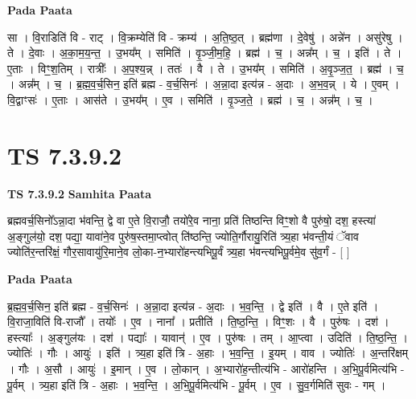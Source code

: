 \documentclass[17pt]{extarticle}
\begin{document}
\textbf{Pada Paata} \newline

सा । वि॒राडिति॑ वि - राट् । वि॒क्रम्येति॑ वि - क्रम्य॑ । अ॒ति॒ष्ठ॒त् । ब्रह्म॑णा । दे॒वेषु॑ । अन्ने॑न । असु॑रेषु । ते । दे॒वाः । अ॒का॒म॒य॒न्त॒ । उ॒भय᳚म् । समिति॑ । वृ॒ञ्जी॒म॒हि॒ । ब्रह्म॑ । च॒ । अन्न᳚म् । च॒ । इति॑ । ते । ए॒ताः । विꣳ॒॒श॒तिम् । रात्रीः᳚ । अ॒प॒श्य॒न्न् । ततः॑ । वै । ते । उ॒भय᳚म् । समिति॑ । अ॒वृ॒ञ्ज॒त॒ । ब्रह्म॑ । च॒ । अन्न᳚म् । च॒ । ब्र॒ह्म॒व॒र्च॒सिन॒ इति॑ ब्रह्म - व॒र्च॒सिनः॑ । अ॒न्ना॒दा इत्य॑न्न - अ॒दाः । अ॒भ॒व॒न्न् । ये । ए॒वम् । वि॒द्वाꣳसः॑ । ए॒ताः । आस॑ते । उ॒भय᳚म् । ए॒व । समिति॑ । वृ॒ञ्ज॒ते॒ । ब्रह्म॑ । च॒ । अन्न᳚म् । च॒ ।  \newline




\section*{ TS 7.3.9.2 }

\textbf{TS 7.3.9.2 } \newline
\textbf{Samhita Paata} \newline

ब्रह्मवर्च॒सिनो᳚ऽन्ना॒दा भ॑वन्ति॒ द्वे वा ए॒ते वि॒राजौ॒ तयो॑रे॒व नाना॒ प्रति॑ तिष्ठन्ति विꣳ॒॒शो वै पुरु॑षो॒ दश॒ हस्त्या॑ अ॒ङ्गुल॑यो॒ दश॒ पद्या॒ यावा॑ने॒व पुरु॑ष॒स्तमा॒प्त्वोत् ति॑ष्ठन्ति॒ ज्योति॒र्गौरायु॒रिति॑ त्र्य॒हा भ॑वन्ती॒यं ॅवाव ज्योति॑र॒न्तरि॑क्षं॒ गौर॒सावायु॑रि॒माने॒व लो॒का-न॒भ्यारो॑हन्त्यभिपू॒र्वं त्र्य॒हा भ॑वन्त्यभिपू॒र्वमे॒व सु॑व॒र्गं - [  ] \newline

\textbf{Pada Paata} \newline

ब्र॒ह्म॒व॒र्च॒सिन॒ इति॑ ब्रह्म - व॒र्च॒सिनः॑ । अ॒न्ना॒दा इत्य॑न्न - अ॒दाः । भ॒व॒न्ति॒ । द्वे इति॑ । वै । ए॒ते इति॑ । वि॒राजा॒विति॑ वि-राजौ᳚ । तयोः᳚ । ए॒व । नाना᳚ । प्रतीति॑ । ति॒ष्ठ॒न्ति॒ । विꣳ॒॒शः । वै । पुरु॑षः । दश॑ । हस्त्याः᳚ । अ॒ङ्गुल॑यः । दश॑ । पद्याः᳚ । यावान्॑ । ए॒व । पुरु॑षः । तम् । आ॒प्त्वा । उदिति॑ । ति॒ष्ठ॒न्ति॒ । ज्योतिः॑ । गौः । आयुः॑ । इति॑ । त्र्य॒हा इति॑ त्रि - अ॒हाः । भ॒व॒न्ति॒ । इ॒यम् । वाव । ज्योतिः॑ । अ॒न्तरि॑क्षम् । गौः । अ॒सौ । आयुः॑ । इ॒मान् । ए॒व । लो॒कान् । अ॒भ्यारो॑ह॒न्तीत्य॑भि - आरो॑हन्ति । अ॒भि॒पू॒र्वमित्य॑भि - पू॒र्वम् । त्र्य॒हा इति॑ त्रि - अ॒हाः । भ॒व॒न्ति॒ । अ॒भि॒पू॒र्वमित्य॑भि - पू॒र्वम् । ए॒व । सु॒व॒र्गमिति॑ सुवः - गम् ।  \newline
\end{document}
